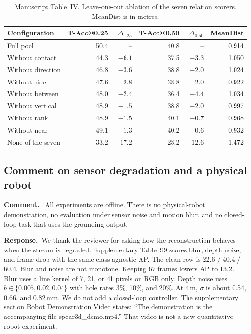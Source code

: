 \documentclass[11pt]{article}
\newcommand{\revcomment}[1]{%
  \par\vspace{0.6em}\noindent\textcolor{revblue}{\textbf{Comment.}}\ %
  \textcolor{revblue}{#1}\par\vspace{0.4em}}
\newcommand{\revresponse}[1]{%
  \par\noindent\textbf{Response.}\ #1\par\vspace{0.3em}}
\begin{document}
\begin{table}[ht]
\centering
\caption{Manuscript Table~IV. Leave-one-out ablation of the seven relation scorers. MeanDist is in metres.}
\label{tab:scorers}
\small
\begin{tabular}{lrrrrr}
\toprule
Configuration & T-Acc@0.25 & \(\Delta_{0.25}\) & T-Acc@0.50 & \(\Delta_{0.50}\) & MeanDist \\
\midrule
Full pool & 50.4 & -- & 40.8 & -- & 0.914 \\
Without contact & 44.3 & \(-6.1\) & 37.5 & \(-3.3\) & 1.050 \\
Without direction & 46.8 & \(-3.6\) & 38.8 & \(-2.0\) & 1.024 \\
Without side & 47.6 & \(-2.8\) & 38.8 & \(-2.0\) & 0.922 \\
Without between & 48.0 & \(-2.4\) & 36.4 & \(-4.4\) & 1.034 \\
Without vertical & 48.9 & \(-1.5\) & 38.8 & \(-2.0\) & 0.997 \\
Without rank & 48.9 & \(-1.5\) & 40.1 & \(-0.7\) & 0.968 \\
Without near & 49.1 & \(-1.3\) & 40.2 & \(-0.6\) & 0.932 \\
None of the seven & 33.2 & \(-17.2\) & 28.2 & \(-12.6\) & 1.472 \\
\bottomrule
\end{tabular}
\end{table}

\subsection*{Comment on sensor degradation and a physical robot}

\revcomment{All experiments are offline. There is no physical-robot demonstration, no evaluation under sensor noise and motion blur, and no closed-loop task that uses the grounding output.}

\revresponse{We thank the reviewer for asking how the reconstruction behaves when the stream is degraded. Supplementary Table~S9 scores blur, depth noise, and frame drop with the same class-agnostic AP. The clean row is 22.6 / 40.4 / 60.4. Blur and noise are not monotone. Keeping 67 frames lowers AP to 13.2. Blur uses a line kernel of 7, 21, or 41 pixels on RGB only. Depth noise uses \(b\in\{0.005,0.02,0.04\}\) with hole rates 3\%, 10\%, and 20\%. At 4\,m, \(\sigma\) is about 0.54, 0.66, and 0.82\,mm. We do not add a closed-loop controller. The supplementary section Robot Demonstration Video states: ``The demonstration is the accompanying file spear3d\_demo.mp4.'' That video is not a new quantitative robot experiment.}
\end{document}
